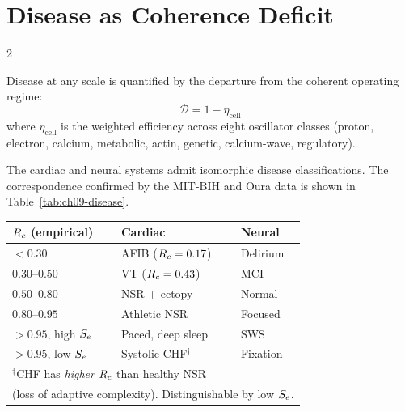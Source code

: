 \section{Disease as Coherence Deficit}
\label{sec:ch09-disease}

\begin{multicols}{2}

\begin{definition}
\label{def:ch09-disease}
Disease at any scale is quantified by the departure from the coherent
operating regime:
\begin{equation}
\mathcal{D} = 1 - \eta_{\mathrm{cell}}
\label{eq:ch09-disease}
\end{equation}
where $\eta_{\mathrm{cell}}$ is the weighted efficiency across eight
oscillator classes (proton, electron, calcium, metabolic, actin,
genetic, calcium-wave, regulatory).
\end{definition}

The cardiac and neural systems admit isomorphic disease classifications.
The correspondence confirmed by the MIT-BIH and Oura data is shown in
Table~\ref{tab:ch09-disease}.

\begin{center}
\begin{tabular}{lll}
\toprule
$R_c$ (empirical) & Cardiac & Neural \\
\midrule
$< 0.30$ & AFIB ($R_c=0.17$) & Delirium \\
$0.30$--$0.50$ & VT ($R_c=0.43$) & MCI \\
$0.50$--$0.80$ & NSR + ectopy & Normal \\
$0.80$--$0.95$ & Athletic NSR & Focused \\
$> 0.95$, high $S_e$ & Paced, deep sleep & SWS \\
$> 0.95$, low $S_e$ & Systolic CHF$^\dagger$ & Fixation \\
\bottomrule
\multicolumn{3}{l}{\small$^\dagger$CHF has \emph{higher} $R_c$ than healthy NSR}\\
\multicolumn{3}{l}{\small (loss of adaptive complexity). Distinguishable by low $S_e$.}\\
\end{tabular}
\label{tab:ch09-disease}
\end{center}


\end{multicols}

